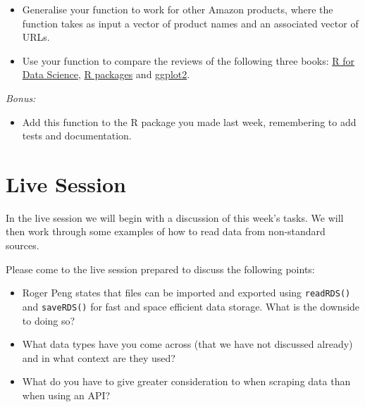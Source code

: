 \documentclass[
  12pt,
]{book}
\providecommand{\tightlist}{%
  \setlength{\itemsep}{0pt}\setlength{\parskip}{0pt}}
\begin{document}
\begin{itemize}
\item
  Generalise your function to work for other Amazon products, where the function takes as input a vector of product names and an associated vector of URLs.
\item
  Use your function to compare the reviews of the following three books: \href{https://www.amazon.com/Data-Science-Transform-Visualize-Model/dp/1491910399/ref=sr_1_1?keywords=r+for+data+science\&qid=1674145765\&s=books\&sprefix=R+for+data+\%2Cstripbooks-intl-ship\%2C157\&sr=1-1}{R for Data Science}, \href{https://www.amazon.com/Packages-Organize-Test-Document-Share/dp/1491910593/ref=sr_1_1?crid=XWR8O7WPKZS9\&keywords=R+packages\&qid=1674145743\&s=books\&sprefix=r+package\%2Cstripbooks-intl-ship\%2C158\&sr=1-1}{R packages} and \href{https://www.amazon.com/ggplot2-Elegant-Graphics-Data-Analysis/dp/331924275X/ref=sr_1_1?crid=24WRUZ93PL2E6\&keywords=ggplot2\&qid=1674145703\&s=books\&sprefix=ggplot2\%2Cstripbooks-intl-ship\%2C190\&sr=1-1}{ggplot2}.
\end{itemize}

\emph{Bonus:}

\begin{itemize}
\tightlist
\item
  Add this function to the R package you made last week, remembering to add tests and documentation.
\end{itemize}

\hypertarget{live-session-1}{%
\section*{Live Session}\label{live-session-1}}

In the live session we will begin with a discussion of this week's tasks. We will then work through some examples of how to read data from non-standard sources.

Please come to the live session prepared to discuss the following points:

\begin{itemize}
\item
  Roger Peng states that files can be imported and exported using \texttt{readRDS()} and \texttt{saveRDS()} for fast and space efficient data storage. What is the downside to doing so?
\item
  What data types have you come across (that we have not discussed already) and in what context are they used?
\item
  What do you have to give greater consideration to when scraping data than when using an API?
\end{itemize}
\end{document}

